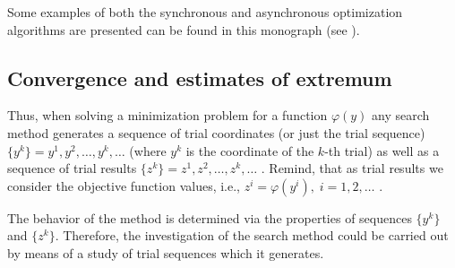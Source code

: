 Some examples of both the synchronous and asynchronous optimization algorithms are presented can be found in this monograph (see \cite{1_BarGerStrChap4, 1_BarGerStrChap6, 1_GriIsrChap5, 1_GriSergChap3}).
\subsection {Convergence and estimates of extremum}
\label {subsec:1.2.3}
Thus, when solving a minimization problem for a function  $\varphi(y)$ any search method generates a sequence of trial coordinates (or just the trial sequence) $\{y^k\}=y^1,y^2,\ldots,y^k,\ldots$  (where $y^k$   is the coordinate of the $k$-th trial) as well as a sequence of trial results $\{z^k\}=z^1,z^2,\ldots,z^k,\ldots$ . Remind, that as trial results we consider the objective function values, i.e., $z^i=\varphi(y^i),\;i=1,2,\ldots$ .    

The behavior of the method is determined via the properties of sequences  $\{y^k\}$ and  $\{z^k\}$. Therefore, the investigation of the search method could be carried out by means of a study of trial sequences which it generates. 

